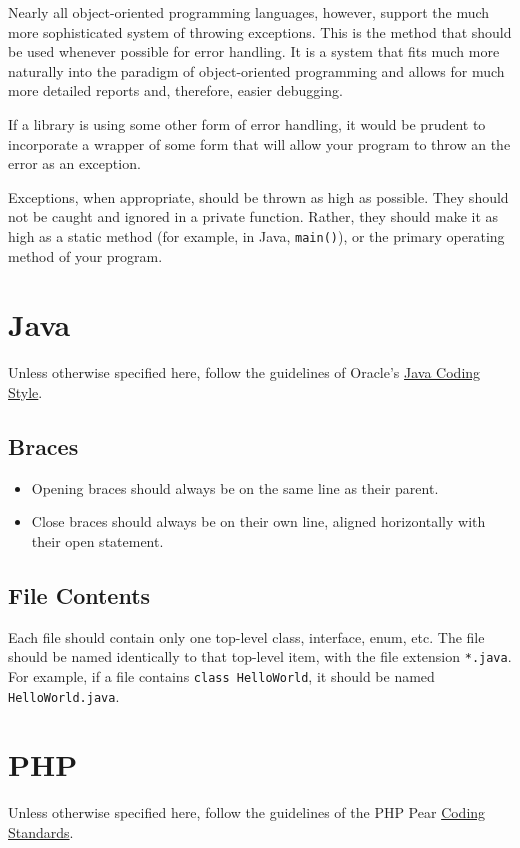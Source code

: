 \documentclass[12pt,letter]{memoir} %
\begin{document}
			Nearly all object-oriented programming languages, however, support
			the much more sophisticated system of throwing exceptions. This is
			the method that should be used whenever possible for error handling.
			It is a system that fits much more naturally into the paradigm of
			object-oriented programming and allows for much more detailed
			reports and, therefore, easier debugging.

			If a library is using some other form of error handling, it would be
			prudent to incorporate a wrapper of some form that will allow your
			program to throw an the error as an exception.

			Exceptions, when appropriate, should be thrown as high as possible.
			They should not be caught and ignored in a private function. Rather,
			they should make it as high as a static method (for example, in
			Java, \texttt{main()}), or the primary operating method of your
			program.
	\section{Java}
		Unless otherwise specified here, follow the guidelines of Oracle's
		\href{http://www.oracle.com/technetwork/java/codeconvtoc-136057.html}{Java Coding Style}.
		\subsection{Braces}
			\begin{itemize}
				\item Opening braces should always be on the same line as their
					parent.
				\item Close braces should always be on their own line, aligned
					horizontally with their open statement.
			\end{itemize}
		\subsection{File Contents}
			Each file should contain only one top-level class, interface, enum,
			etc. The file should be named identically to that top-level item,
			with the file extension \texttt{*.java}. For example, if a file
			contains \texttt{class HelloWorld}, it should be named
			\texttt{HelloWorld.java}.
	\section{PHP}
		Unless otherwise specified here, follow the guidelines of the PHP Pear
		\href{http://pear.php.net/manual/en/standards.php}{Coding Standards}.
\end{document}
